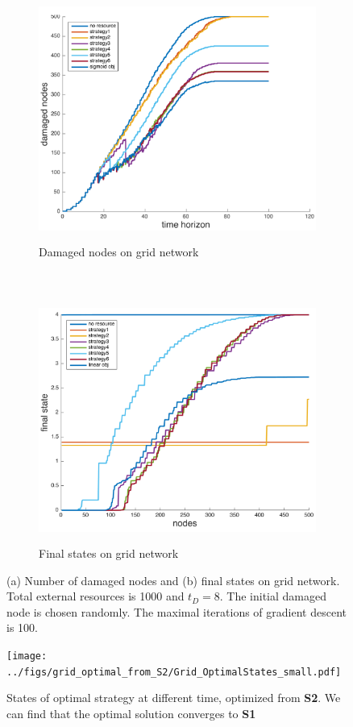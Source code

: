 \begin{figure}
	\centering
	\begin{subfigure}[t]{0.8\textwidth}
		\centering
		\includegraphics[height=80mm]{../figs/no_linear_approximation/Grid_damaged_small.pdf}
		\caption{Damaged nodes on grid network}
	\end{subfigure}
	~
	\begin{subfigure}[t]{0.8\textwidth}
		\centering
		\includegraphics[height=80mm]{../figs/no_linear_approximation/Grid_finalState_small.pdf}
		\caption{Final states on grid network}
	\end{subfigure}
	\caption{(a) Number of damaged nodes and (b) final states on grid network. Total external resources is 1000 and $t_D=8$. The initial damaged node is chosen randomly. The maximal iterations of gradient descent is 100.}
	\label{fig:opt_on_grid}
\end{figure}

\begin{figure}
	\centering
	\texttt{[image: ../figs/grid\_optimal\_from\_S2/Grid\_OptimalStates\_small.pdf]}
	\caption{States of optimal strategy at different time, optimized from \textbf{S2}. We can find that the optimal solution converges to \textbf{S1}}
	\label{fig:opt_from_S2}
\end{figure}

